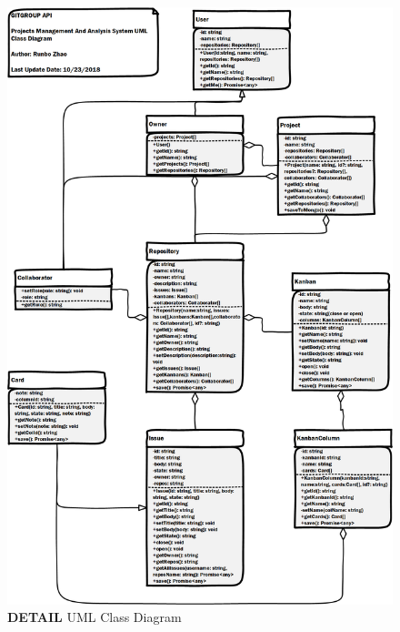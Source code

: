 \documentclass[12pt,a4paper]{report}
\begin{document}
\begin{figure}[h]
	\centering
	\includegraphics[height=0.95\textheight]{./pics/ClassDiagram.png}
	\caption{\textbf{DETAIL} UML Class Diagram}
\end{figure}


\cleardoublepage
\listoffigures
\cleardoublepage
\listoftables
\end{document}
